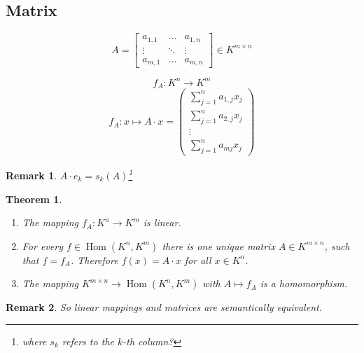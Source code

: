 \documentclass[a4paper,landscape,twocolumn]{article}
\newtheorem{theorem}{Theorem}[section]
\newtheorem{rem}{Remark}[section]
\DeclareMathOperator\Hom{Hom} %
\begin{document}
\subsection{Matrix}
\[
  A = \begin{bmatrix}
    a_{1,1} & \ldots & a_{1,n} \\
    \vdots & \ddots & \vdots \\
    a_{m,1} & \ldots & a_{m,n}
  \end{bmatrix}
  \in K^{m\times n}
\]

\[ f_A: K^n \rightarrow K^m \]
\[
  f_A: x \mapsto A \cdot x = \begin{pmatrix}
    \sum_{j=1}^n a_{1,j} x_j \\
    \sum_{j=1}^n a_{2,j} x_j \\
    \vdots \\
    \sum_{j=1}^n a_{mj} x_j
  \end{pmatrix}
\]

\begin{rem}
  \label{bemerkung-6.6}
  $A \cdot e_k = s_k(A)$\footnote{where $s_k$ refers to the $k$-th column?}
\end{rem}
\begin{theorem}
  \begin{enumerate}
    \item The mapping $f_A: K^n \rightarrow K^m$ is linear.
    \item For every $f \in \Hom(K^n, K^m)$ there is one unique matrix $A \in K^{m \times n}$,
      such that $f = f_A$. Therefore $f(x) = A \cdot x$ for all $x \in K^n$.
    \item The mapping $K^{m\times n} \rightarrow \Hom(K^n, K^m)$ with $A \mapsto f_A$ is a homomorphism.
  \end{enumerate}
\end{theorem}

\begin{rem}
  So linear mappings and matrices are semantically equivalent.
\end{rem}
\end{document}
